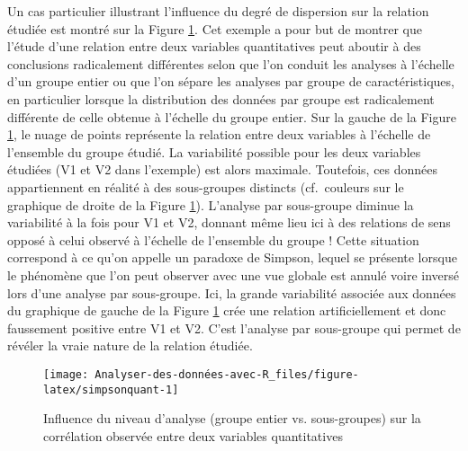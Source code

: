 \documentclass[
]{book}
\begin{document}
Un cas particulier illustrant l'influence du degré de dispersion sur la relation étudiée est montré sur la Figure \ref{fig:simpsonquant}. Cet exemple a pour but de montrer que l'étude d'une relation entre deux variables quantitatives peut aboutir à des conclusions radicalement différentes selon que l'on conduit les analyses à l'échelle d'un groupe entier ou que l'on sépare les analyses par groupe de caractéristiques, en particulier lorsque la distribution des données par groupe est radicalement différente de celle obtenue à l'échelle du groupe entier. Sur la gauche de la Figure \ref{fig:simpsonquant}, le nuage de points représente la relation entre deux variables à l'échelle de l'ensemble du groupe étudié. La variabilité possible pour les deux variables étudiées (V1 et V2 dans l'exemple) est alors maximale. Toutefois, ces données appartiennent en réalité à des sous-groupes distincts (cf.~couleurs sur le graphique de droite de la Figure \ref{fig:simpsonquant}). L'analyse par sous-groupe diminue la variabilité à la fois pour V1 et V2, donnant même lieu ici à des relations de sens opposé à celui observé à l'échelle de l'ensemble du groupe ! Cette situation correspond à ce qu'on appelle un paradoxe de Simpson, lequel se présente lorsque le phénomène que l'on peut observer avec une vue globale est annulé voire inversé lors d'une analyse par sous-groupe. Ici, la grande variabilité associée aux données du graphique de gauche de la Figure \ref{fig:simpsonquant} crée une relation artificiellement et donc faussement positive entre V1 et V2. C'est l'analyse par sous-groupe qui permet de révéler la vraie nature de la relation étudiée.

\begin{figure}

{\centering \texttt{[image: Analyser-des-données-avec-R\_files/figure-latex/simpsonquant-1]} 

}

\caption{Influence du niveau d'analyse (groupe entier vs. sous-groupes) sur la corrélation observée entre deux variables quantitatives}\label{fig:simpsonquant}
\end{figure}
\end{document}
